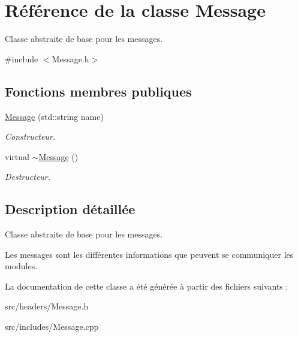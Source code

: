\hypertarget{classMessage}{\section{Référence de la classe Message}
\label{classMessage}
}


Classe abstraite de base pour les messages.  




{\ttfamily \#include $<$Message.\-h$>$}

\subsection*{Fonctions membres publiques}
\begin{DoxyCompactItemize}
\item 
\hypertarget{classMessage_ae24b52eaeefed7575b6972805bc33f82}{\hyperlink{classMessage_ae24b52eaeefed7575b6972805bc33f82}{Message} (std\-::string name)}\label{classMessage_ae24b52eaeefed7575b6972805bc33f82}

\begin{DoxyCompactList}\small\item\em Constructeur. \end{DoxyCompactList}\item 
\hypertarget{classMessage_a3f7275462831f787a861271687bcad67}{virtual \hyperlink{classMessage_a3f7275462831f787a861271687bcad67}{$\sim$\-Message} ()}\label{classMessage_a3f7275462831f787a861271687bcad67}

\begin{DoxyCompactList}\small\item\em Destructeur. \end{DoxyCompactList}\end{DoxyCompactItemize}


\subsection{Description détaillée}
Classe abstraite de base pour les messages. 

Les messages sont les différentes informations que peuvent se communiquer les modules. 

La documentation de cette classe a été générée à partir des fichiers suivants \-:\begin{DoxyCompactItemize}
\item 
src/headers/Message.\-h\item 
src/includes/Message.\-cpp\end{DoxyCompactItemize}
